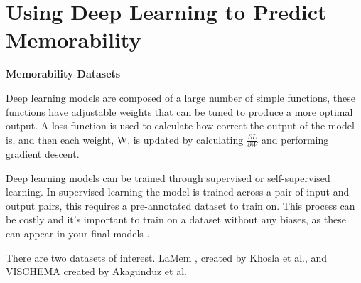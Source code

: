 \documentclass{UoYCSproject}
\begin{document}
\section{Using Deep Learning to Predict Memorability}


\textbf{Memorability Datasets}


Deep learning models are composed of a large number of simple functions, these functions have adjustable weights that can be tuned to produce a more optimal output. A loss function is used to calculate how correct the output of the model is, and then each weight, W, is updated by calculating $\frac{\partial L}{\partial W}$ and performing gradient descent.

Deep learning models can be trained through supervised or self-supervised learning. In supervised learning the model is trained across a pair of input and output pairs, this requires a pre-annotated dataset to train on. This process can be costly and it's important to train on a dataset without any biases, as these can appear in your final models \cite{dastin_2018, najibi_2020}.  

There are two datasets of interest. LaMem \cite{ICCV15_Khosla}, created by Khosla et al., and VISCHEMA \cite{VischemaPaper} created by Akagunduz et al. 
\end{document}
